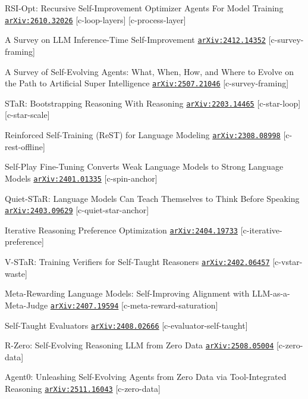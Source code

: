 \begin{refs}
[10] RSI-Opt: Recursive Self-Improvement Optimizer Agents For Model Training \href{https://arxiv.org/abs/2610.32026}{\texttt{arXiv:2610.32026}} [c-loop-layers] [c-process-layer]\par
[11] A Survey on LLM Inference-Time Self-Improvement \href{https://arxiv.org/abs/2412.14352}{\texttt{arXiv:2412.14352}} [c-survey-framing]\par
[12] A Survey of Self-Evolving Agents: What, When, How, and Where to Evolve on the Path to Artificial Super Intelligence \href{https://arxiv.org/abs/2507.21046}{\texttt{arXiv:2507.21046}} [c-survey-framing]\par
[13] STaR: Bootstrapping Reasoning With Reasoning \href{https://arxiv.org/abs/2203.14465}{\texttt{arXiv:2203.14465}} [c-star-loop] [c-star-scale]\par
[14] Reinforced Self-Training (ReST) for Language Modeling \href{https://arxiv.org/abs/2308.08998}{\texttt{arXiv:2308.08998}} [c-rest-offline]\par
[15] Self-Play Fine-Tuning Converts Weak Language Models to Strong Language Models \href{https://arxiv.org/abs/2401.01335}{\texttt{arXiv:2401.01335}} [c-spin-anchor]\par
[16] Quiet-STaR: Language Models Can Teach Themselves to Think Before Speaking \href{https://arxiv.org/abs/2403.09629}{\texttt{arXiv:2403.09629}} [c-quiet-star-anchor]\par
[17] Iterative Reasoning Preference Optimization \href{https://arxiv.org/abs/2404.19733}{\texttt{arXiv:2404.19733}} [c-iterative-preference]\par
[18] V-STaR: Training Verifiers for Self-Taught Reasoners \href{https://arxiv.org/abs/2402.06457}{\texttt{arXiv:2402.06457}} [c-vstar-waste]\par
[19] Meta-Rewarding Language Models: Self-Improving Alignment with LLM-as-a-Meta-Judge \href{https://arxiv.org/abs/2407.19594}{\texttt{arXiv:2407.19594}} [c-meta-reward-saturation]\par
[20] Self-Taught Evaluators \href{https://arxiv.org/abs/2408.02666}{\texttt{arXiv:2408.02666}} [c-evaluator-self-taught]\par
[21] R-Zero: Self-Evolving Reasoning LLM from Zero Data \href{https://arxiv.org/abs/2508.05004}{\texttt{arXiv:2508.05004}} [c-zero-data]\par
[22] Agent0: Unleashing Self-Evolving Agents from Zero Data via Tool-Integrated Reasoning \href{https://arxiv.org/abs/2511.16043}{\texttt{arXiv:2511.16043}} [c-zero-data]\par

\end{refs}
